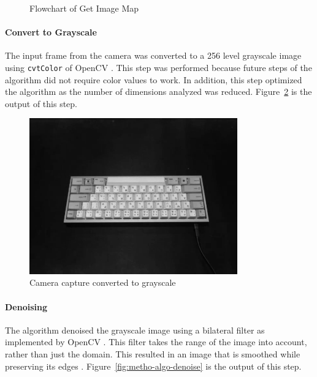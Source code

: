\documentclass{report}
\begin{document}
\begin{figure}[H]
	\caption{Flowchart of Get Image Map}
	\label{fig:metho-algo-key-image-map}
\end{figure}

\newpage

\paragraph{Convert to Grayscale}
The input frame from the camera was converted to a 256 level grayscale image
using \texttt{cvtColor} of OpenCV \parencite{opencv-cvtColor}. This step was
performed because future steps of the algorithm did not require color values to
work. In addition, this step optimized the algorithm as the number of dimensions
analyzed was reduced. Figure~\ref{fig:metho-algo-convert} is the output of this
step.

\begin{figure}[H]
	\centering
	\includegraphics[width=0.8\textwidth]{grayscale.png}
	\caption{Camera capture converted to grayscale}
	\label{fig:metho-algo-convert}
	\centering
\end{figure}

\paragraph{Denoising}
The algorithm denoised the grayscale image using a bilateral filter as
implemented by OpenCV \parencite{opencv-bilateral-filter}. This filter takes the
range of the image into account, rather than just the domain. This resulted in
an image that is smoothed while preserving its edges
\parencite{bilateral-filter}. Figure~\ref{fig:metho-algo-denoise} is the output
of this step.
\end{document}
